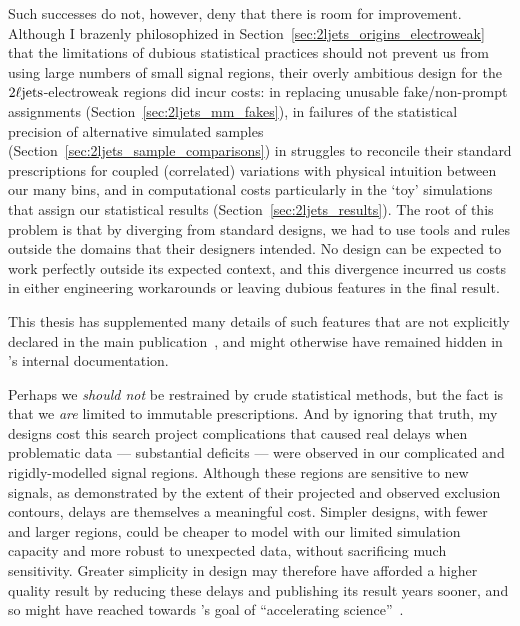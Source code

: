 Such successes do not, however, deny that there is room for improvement.
Although I brazenly philosophized in
Section~\ref{sec:2ljets_origins_electroweak} that the limitations of dubious
statistical practices should not prevent us from using large numbers of small
signal regions, their overly ambitious design for the $2\ell\mathrm{jets}$-electroweak
regions did incur costs:
in replacing unusable fake/non-prompt assignments
(Section~\ref{sec:2ljets_mm_fakes}),
in failures of the statistical precision of alternative simulated samples
(Section~\ref{sec:2ljets_sample_comparisons})
in struggles to reconcile their standard prescriptions for coupled
(correlated) variations with physical intuition between our many bins,
and in computational costs particularly in the `toy' simulations that assign
our statistical results (Section~\ref{sec:2ljets_results}).
The root of this problem is that by diverging from standard designs, we
had to use tools and rules outside the domains that their designers
intended.
No design can be expected to work perfectly outside its expected context,
and this divergence incurred us costs in either engineering workarounds or
leaving dubious features in the final result.

This thesis has supplemented many details of such features that are not
explicitly declared in the main publication~\cite{atlas2022searches},
and might otherwise have remained hidden in \atlas's internal documentation.

Perhaps we \emph{should not} be restrained by crude statistical
methods, but the fact is that we \emph{are} limited to immutable prescriptions.
And by ignoring that truth, my designs cost this search project complications
that caused real delays when problematic data
--- substantial deficits ---
were observed in our complicated and rigidly-modelled signal regions.
Although these regions are sensitive to new signals, as demonstrated by the
extent of their projected and observed exclusion contours, delays are
themselves a meaningful cost.
Simpler designs, with fewer and larger regions, could be cheaper to model with
our limited simulation capacity and more robust to unexpected data, without
sacrificing much sensitivity.
Greater simplicity in design may therefore have afforded a higher quality
result by reducing these delays and publishing its result years sooner,
and so might have reached towards \cern's goal of
``accelerating science''~\cite{Radford:1551933}.

